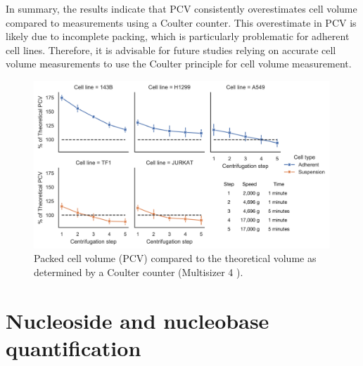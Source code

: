 In summary, the results indicate that PCV consistently overestimates cell volume compared to measurements using a Coulter counter.
This overestimate in PCV is likely due to incomplete packing, which is particularly problematic for adherent cell lines.
Therefore, it is advisable for future studies relying on accurate cell volume measurements to use the Coulter principle for cell volume measurement.

\begin{figure}[ht]
    \centering
    \includegraphics[width=0.99\textwidth]{figures/chap2/app/CCvsPCV.pdf}
    \caption[Packed cell volume vs. Coulter counter]{
    Packed cell volume (PCV) compared to the theoretical volume as determined by a Coulter counter (Multisizer 4 ).
    }
    \label{fig:app_ch2:CCvsPCV}
\end{figure}











\chapter{Nucleoside and nucleobase quantification}


